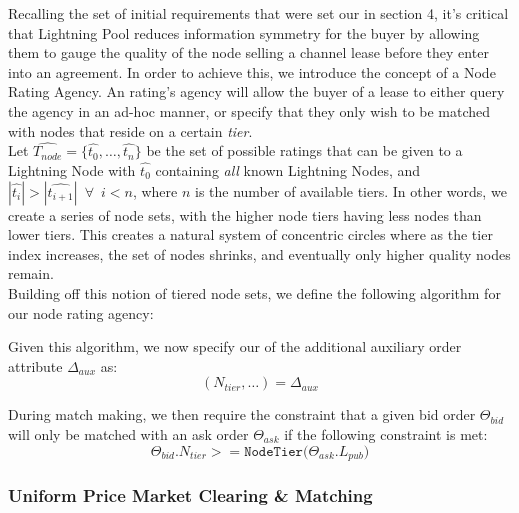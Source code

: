 \documentclass[10pt,a4paper]{article}
\theoremstyle{definition}
\begin{document}
Recalling the set of initial requirements that were set our in section 4, it's
critical that Lightning Pool reduces information symmetry for the buyer by
allowing them to gauge the quality of the node selling a channel lease before
they enter into an agreement. In order to achieve this, we introduce the
concept of a Node Rating Agency. An rating's agency will allow the buyer of a
lease to either query the agency in an ad-hoc manner, or specify that they only
wish to be matched with nodes that reside on a certain \emph{tier}. \\


Let $\hat{T_{node}} = \{\hat{t_0}, \dots, \hat{t_n} \}$ be the set of possible
ratings that can be given to a Lightning Node with $\hat{t_0}$ containing
\emph{all} known Lightning Nodes, and $|\hat{t_i}| > |\hat{t_{i+1}}| \enspace
\forall \enspace i < n$, where $n$ is the number of available tiers. In other
words, we create a series of node sets, with the higher node tiers having less
nodes than lower tiers.  This creates a natural system of concentric circles
where as the tier index increases, the set of nodes shrinks, and eventually
only higher quality nodes remain. \\

Building off this notion of tiered node sets, we define the following algorithm
for our node rating agency:
\begin{pchstack}[boxed,center, space=1em]
\end{pchstack}

Given this algorithm, we now specify our of the additional auxiliary order
attribute $\Delta_{aux}$ as: \[
    (N_{tier}, \dots) = \Delta_{aux}
\]

During match making, we then require the constraint that a given bid order
$\Theta_{bid}$ will only be matched with an ask order $\Theta_{ask}$ if the
following constraint is met:
\[
    \Theta_{bid}.N_{tier} >= \texttt{NodeTier($\Theta_{ask}.L_{pub}$)}
\]


\subsubsection{Uniform Price Market Clearing \& Matching}
\end{document}
